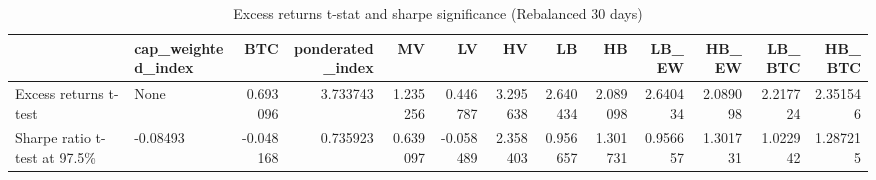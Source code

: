 \begin{table}
\centering
\caption{Excess returns t-stat and sharpe significance (Rebalanced 30 days)}
\label{signif100_30}
\begin{tabular}{llrrrrrrrrrrr}
\toprule
{} & cap\_weighted\_index &       BTC &  ponderated\_index &        MV &        LV &        HV &        LB &        HB &     LB\_EW &     HB\_EW &    LB\_BTC &    HB\_BTC \\
\midrule
Excess returns t-test        &               None &  0.693096 &          3.733743 &  1.235256 &  0.446787 &  3.295638 &  2.640434 &  2.089098 &  2.640434 &  2.089098 &  2.217724 &  2.351546 \\
Sharpe ratio t-test at 97.5\% &           -0.08493 & -0.048168 &          0.735923 &  0.639097 & -0.058489 &  2.358403 &  0.956657 &  1.301731 &  0.956657 &  1.301731 &  1.022942 &  1.287215 \\
\bottomrule
\end{tabular}
\end{table}
